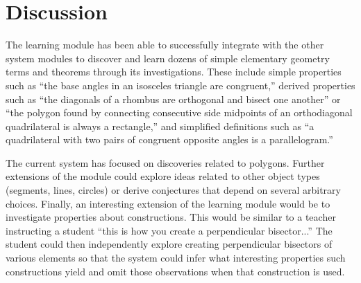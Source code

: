 \newpage
\section{Discussion}

The learning module has been able to successfully integrate with the
other system modules to discover and learn dozens of simple elementary
geometry terms and theorems through its investigations. These include
simple properties such as ``the base angles in an isosceles triangle
are congruent,'' derived properties such as ``the diagonals of a
rhombus are orthogonal and bisect one another'' or ``the polygon found
by connecting consecutive side midpoints of an orthodiagonal
quadrilateral is always a rectangle,'' and simplified definitions such
as ``a quadrilateral with two pairs of congruent opposite angles is a
parallelogram.''

The current system has focused on discoveries related to
polygons. Further extensions of the module could explore ideas related
to other object types (segments, lines, circles) or derive conjectures
that depend on several arbitrary choices. Finally, an interesting
extension of the learning module would be to investigate properties
about constructions. This would be similar to a teacher instructing a
student ``this is how you create a perpendicular bisector...'' The
student could then independently explore creating perpendicular
bisectors of various elements so that the system could infer what
interesting properties such constructions yield and omit those
observations when that construction is used.
